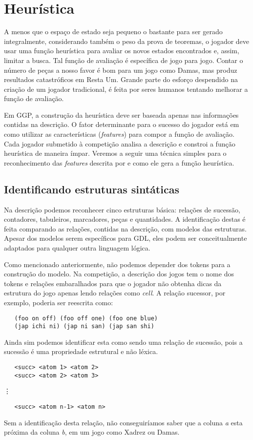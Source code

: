 \section{Heurística}
A menos que o espaço de estado seja pequeno o bastante para ser gerado
integralmente, considerando também o peso da prova de teoremas, o jogador deve
usar uma função heurística para avaliar os novos estados encontrados e, assim,
limitar a busca. Tal função de avaliação é específica de jogo para jogo. Contar
o número de peças a nosso favor é bom para um jogo como Damas, mas produz
resultados catastróficos em Resta Um. Grande parte do esforço despendido na
criação de um jogador tradicional, é feita por seres humanos tentando melhorar a
função de avaliação.
 
Em GGP, a construção da heurística deve ser baseada apenas nas informações
contidas na descrição. O fator determinante para o sucesso do jogador está em
como utilizar as características ({\it features}) para compor a função de
avaliação. Cada jogador submetido à competição analisa a descrição e constroi a
função heurística de maneira ímpar. Veremos a seguir uma técnica simples para o
reconhecimento das {\it features} descrita por \cite{dresner} e como ele gera a função heurística.
 
\subsection{Identificando estruturas sintáticas}
Na descrição podemos reconhecer cinco estruturas básica: relações de sucessão,
contadores, tabuleiros, marcadores, peças e quantidades. A identificação destas
é feita comparando as relações, contidas na descrição, com modelos das
estruturas. Apesar dos modelos serem específicos para GDL, eles podem ser
conceitualmente adaptados para qualquer outra linguagem lógica.
 
Como mencionado anteriormente, não podemos depender dos tokens para a construção
do modelo. Na competição, a descrição dos jogos tem o nome dos tokens e relações
embaralhados para que o jogador não obtenha dicas da estrutura do jogo apenas
lendo relações como {\it cell}. A relação sucessor, por exemplo, poderia ser
reescrita como:
\begin{verbatim}
   (foo on off) (foo off one) (foo one blue)
   (jap ichi ni) (jap ni san) (jap san shi)
\end{verbatim}
Ainda sim podemos identificar esta como sendo uma relação de sucessão, pois
a sucessão é uma propriedade estrutural e não léxica.
\begin{verbatim}
   <succ> <atom 1> <atom 2>
   <succ> <atom 2> <atom 3>
\end{verbatim}
\hspace{2cm} \vdots
\begin{verbatim}
   <succ> <atom n-1> <atom n>
\end{verbatim}
Sem a identificação desta relação, não conseguiríamos saber que a coluna {\it a}
esta próxima da coluna {\it b}, em um jogo como Xadrez ou Damas.
 

